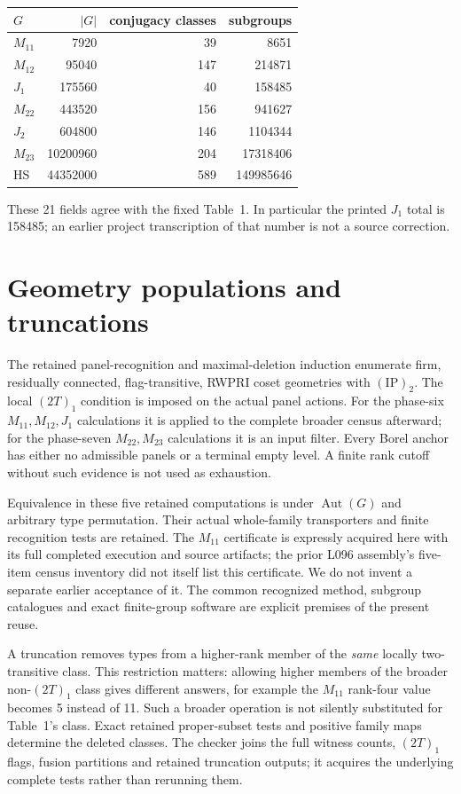 \documentclass[11pt]{article}
\begin{document}
\begin{center}\small
\begin{tabular}{lrrr}\toprule
$G$&$|G|$&conjugacy classes&subgroups\\\midrule
$M_{11}$&7920&39&8651\\
$M_{12}$&95040&147&214871\\
$J_1$&175560&40&158485\\
$M_{22}$&443520&156&941627\\
$J_2$&604800&146&1104344\\
$M_{23}$&10200960&204&17318406\\
HS&44352000&589&149985646\\\bottomrule
\end{tabular}
\end{center}
\noindent These 21 fields agree with the fixed Table~1. In particular the
printed $J_1$ total is 158485; an earlier project transcription of that
number is not a source correction.

\section{Geometry populations and truncations}
The retained panel-recognition and maximal-deletion induction enumerate
firm, residually connected, flag-transitive, RWPRI coset geometries with
$(\mathrm{IP})_2$. The local $(2T)_1$ condition is imposed on the actual
panel actions. For the phase-six $M_{11},M_{12},J_1$ calculations it is
applied to the complete broader census afterward; for the phase-seven
$M_{22},M_{23}$ calculations it is an input filter. Every Borel anchor
has either no admissible panels or a terminal empty level. A finite rank
cutoff without such evidence is not used as exhaustion.

Equivalence in these five retained computations is under
$\operatorname{Aut}(G)$ and arbitrary type permutation. Their actual
whole-family transporters and finite recognition tests are retained.
The $M_{11}$ certificate is expressly acquired here with its full
completed execution and source artifacts; the prior L096 assembly's
five-item census inventory did not itself list this certificate. We do
not invent a separate earlier acceptance of it. The common recognized
method, subgroup catalogues and exact finite-group software are explicit
premises of the present reuse.

A truncation removes types from a higher-rank member of the \emph{same}
locally two-transitive class. This restriction matters: allowing higher
members of the broader non-$(2T)_1$ class gives different answers, for
example the $M_{11}$ rank-four value becomes 5 instead of 11. Such a
broader operation is not silently substituted for Table~1's class.
Exact retained proper-subset tests and positive family maps determine
the deleted classes. The checker joins the full witness counts,
$(2T)_1$ flags, fusion partitions and retained truncation outputs; it
acquires the underlying complete tests rather than rerunning them.
\end{document}
